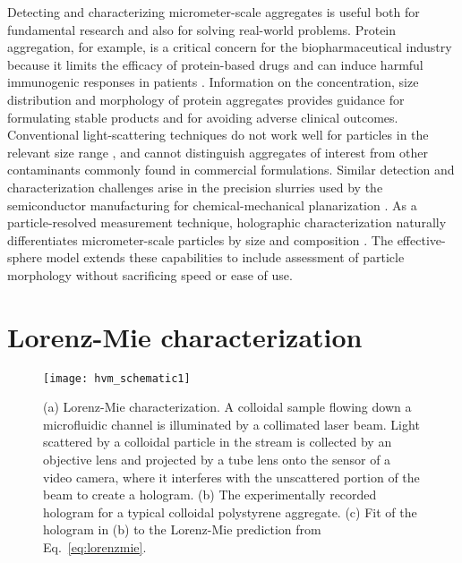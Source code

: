 Detecting and characterizing micrometer-scale aggregates
is useful both for fundamental research and also for solving 
real-world problems.
Protein aggregation, for example, is a critical concern
for the biopharmaceutical industry because it limits
the efficacy of protein-based drugs and can induce harmful
immunogenic responses in patients \cite{wang05}.
Information on the concentration, size distribution and morphology of protein
aggregates provides guidance for formulating stable products and for
avoiding adverse clinical outcomes.
Conventional light-scattering techniques do not work well
for particles in the relevant size range \cite{panchal14}, and cannot
distinguish aggregates of interest from other contaminants
commonly found in commercial formulations.
Similar detection and characterization challenges arise in
the precision slurries used by the semiconductor manufacturing
for chemical-mechanical planarization \cite{basim02}.
As a particle-resolved measurement technique, holographic
characterization naturally differentiates micrometer-scale
particles by size and composition \cite{yevick14}.
The effective-sphere model extends these capabilities
to include assessment of particle morphology without
sacrificing speed or ease of use.

\section{Lorenz-Mie characterization}
\label{sec:lorenzmiecharacterization}

\begin{figure}[!t]
  \centering
  \texttt{[image: hvm\_schematic1]}
  \caption[Schematic representation of Lorenz-Mie characterization]
  {(a) Lorenz-Mie characterization.  A colloidal sample
    flowing down a microfluidic channel is illuminated by a collimated
    laser beam.  Light scattered by a colloidal particle in the stream
    is collected by an objective lens and projected by a tube lens onto the sensor of
    a video camera, where it interferes with the unscattered portion
    of the beam to create a hologram.  (b) The experimentally recorded hologram for a
    typical colloidal polystyrene aggregate.  (c) Fit of the hologram
    in (b) to the Lorenz-Mie prediction from Eq.~\eqref{eq:lorenzmie}.}
  \label{fig:hvmschematic}
\end{figure}

